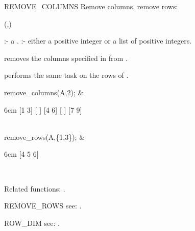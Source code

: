 \begin{Operator}[removecolumns]{REMOVE_COLUMNS}
Remove columns, remove rows:

\begin{Syntax}
(,)
\end{Syntax}

       :- a .
 :- either a positive integer or a list of positive 
                       integers.

 removes the columns specified in 
 from . 

 performs the same task on the rows of .

\begin{Examples} 

remove_columns(A,2); &
\begin{multilineoutput}{6cm}
[1  3]
[    ]
[4  6]
[    ]
[7  9]
\end{multilineoutput}\\

remove_rows(A,\{1,3\}); &
\begin{multilineoutput}{6cm}
[4  5  6]
\end{multilineoutput}\\


\end{Examples}

Related functions: .

\end{Operator}


\begin{Operator}[removerows]{REMOVE_ROWS}
see:  .
\end{Operator}


\begin{Operator}[rowdim]{ROW_DIM}
see:  .
\end{Operator}


